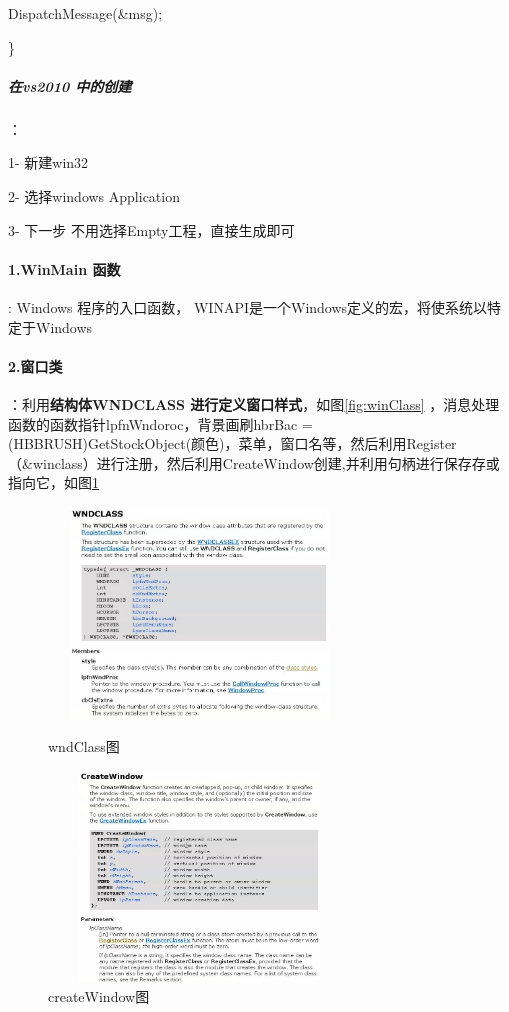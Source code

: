 \documentclass[UTF8,a4paper,8pt]{ctexart}
\begin{document}
		   	  	DispatchMessage(\&msg);
		   	  	
		   	  \}
		   	  \subparagraph{在vs2010 中的创建}：
		   	  
		   	   1- 新建win32
		   	   
		       2- 选择windows Application
		       
		       3- 下一步 不用选择Empty工程，直接生成即可
 	\paragraph {1.WinMain 函数}
	 	: Windows 程序的入口函数， WINAPI是一个Windows定义的宏，将使系统以特定于Windows 
 		
 	\paragraph {2.窗口类}
	 	：利用\textbf{结构体WNDCLASS 进行定义窗口样式}，如图\ref{fig:winClass} ，消息处理函数的函数指针lpfnWndoroc，背景画刷hbrBac = (HBBRUSH)GetStockObject(颜色)，菜单，窗口名等，然后利用Register（\&winclass）进行注册，然后利用CreateWindow创建,并利用句柄进行保存存或指向它，如图\ref{fig:createWindow} 
    	\begin{figure}
		   \begin{center}
			\begin{minipage}[H]{0.5\textwidth}
			 \centering
				\includegraphics[angle=0,width=8cm,height=5.6cm]{wndClass.jpg}%
				\caption{wndClass图}
				\label{fig:winClass}
		     \end{minipage}%
			\begin{minipage}[H]{0.5\textwidth} 
			 \centering
			    \includegraphics[angle=0,width=8cm,height=5.6cm]{createWindow.jpg}
			    \caption{createWindow图 }
				\label{fig:createWindow}
			\end{minipage}
		\end{center}
	\end{figure} 	
 		
\end{document}
